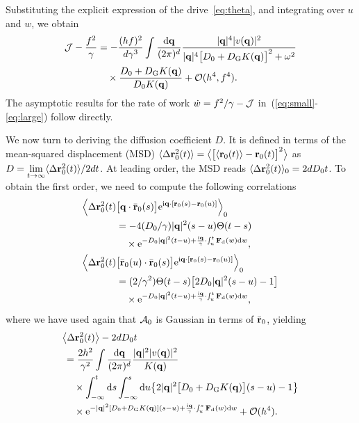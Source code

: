 \documentclass[pre, superscriptaddress, twocolumn,pre]{revtex4-1}
\begin{document}
Substituting the explicit expression of the drive~\eqref{eq:theta}, and integrating over $u$ and $w$, we obtain
\begin{equation}
	\begin{aligned}
		{\cal J} - \frac{f^2}{\gamma} &= - \frac{(hf)^2}{d\gamma^3} \int \frac{{\rm d}{\bf q}}{(2\pi)^d} \frac{|{\bf q}|^4 |v({\bf q})|^2}{|{\bf q}|^4\big[D_0+D_{\rm G}K({\bf q})\big]^2 + \omega^2}
		\\
		&\quad\times \frac{D_0+D_{\rm G}K({\bf q})}{D_0K({\bf q})} + {\cal O}(h^4,f^4) .
	\end{aligned}
\end{equation}
The asymptotic results for the rate of work $\dot w = f^2/\gamma-{\cal J}$ in~(\ref{eq:small}-\ref{eq:large}) follow directly.


We now turn to deriving the diffusion coefficient $D$. It is defined in terms of the mean-squared displacement (MSD) $\langle\Delta{\bf r}_0^2(t)\rangle=\big\langle\big[\langle{\bf r}_0(t)\rangle - {\bf r}_0(t)\big]^2\big\rangle$ as $D=\underset{t\to\infty}{\lim}\langle\Delta{\bf r}_0^2(t)\rangle / 2 d t$. At leading order, the MSD reads $\langle\Delta{\bf r}_0^2(t)\rangle_0 = 2dD_0t$. To obtain the first order, we need to compute the following correlations
\begin{equation}
	\begin{aligned}
		\Big\langle\Delta{\bf r}^2_0(t)& \big[{\bf q}\cdot\bar{\bf r}_0(s)\big] {\rm e}^{{\rm i}{\bf q}\cdot[{\bf r}_0(s)-{\bf r}_0(u)]}\Big\rangle_0
		\\
		&= - 4 (D_0/\gamma)|{\bf q}|^2(s-u) \Theta(t-s)
		\\
		&\quad\times{\rm e}^{ - D_0|{\bf q}|^2(t-u) + \frac{{\rm i}{\bf q}}{\gamma}\cdot\int_u^t {\bf F}_{\rm d}(w) {\rm d}w},
		\\
		\Big\langle\Delta{\bf r}^2_0(t)& \big[\bar{\bf r}_0(u)\cdot\bar{\bf r}_0(s)\big] {\rm e}^{{\rm i}{\bf q}\cdot[{\bf r}_0(s)-{\bf r}_0(u)]}\Big\rangle_0
		\\
		&= (2/\gamma^2)\Theta(t-s) \big[2D_0|{\bf q}|^2(s-u)-1\big]
		\\
		&\quad\times{\rm e}^{ - D_0|{\bf q}|^2(t-u) + \frac{{\rm i}{\bf q}}{\gamma}\cdot\int_u^t {\bf F}_{\rm d}(w) {\rm d}w} ,
	\end{aligned}
\end{equation}
where we have used again that ${\cal A}_0$ is Gaussian in terms of $\bar{\bf r}_0$, yielding
\begin{equation}
	\begin{aligned}
		&\big\langle\Delta{\bf r}^2_0(t)\big\rangle - 2 d D_0 t
		\\
		&\,= \frac{2h^2}{\gamma^2} \int \frac{{\rm d}{\bf q}}{(2\pi)^d} \frac{|{\bf q}|^2 |v({\bf q})|^2}{K({\bf q})}
		\\
		&\,\quad\times \int_{-\infty}^t{\rm d}s \int_{-\infty}^s{\rm d}u \big\{ 2|{\bf q}|^2\big[D_0+D_{\rm G}K({\bf q})\big](s-u) - 1\big\}
		\\
		&\,\quad\times {\rm e}^{ -|{\bf q}|^2[D_0+D_{\rm G}K({\bf q})](s-u) + \frac{{\rm i}{\bf q}}{\gamma}\cdot\int_u^s{\bf F}_{\rm d}(w) {\rm d}w } + {\cal O}(h^4) .
	\end{aligned}
\end{equation}
\end{document}
